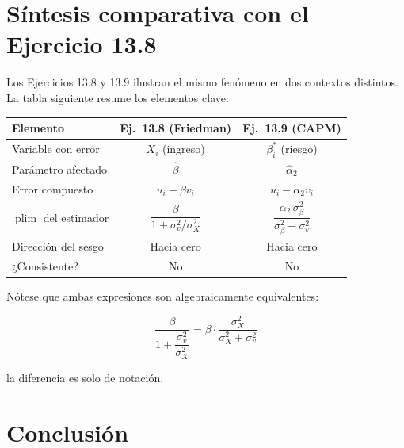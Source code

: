 \documentclass[12pt,letterpaper]{article}
\newcommand{\plim}{\operatorname{plim}}
\begin{document}
\section{Síntesis comparativa con el Ejercicio 13.8}

Los Ejercicios 13.8 y 13.9 ilustran el mismo fenómeno en dos contextos
distintos. La tabla siguiente resume los elementos clave:

\begin{center}
\renewcommand{\arraystretch}{1.4}
\begin{tabular}{lcc}
\toprule
\textbf{Elemento}        & \textbf{Ej.\ 13.8 (Friedman)} & \textbf{Ej.\ 13.9 (CAPM)} \\
\midrule
Variable con error       & $X_{i}$ (ingreso)   & $\beta_{i}^{*}$ (riesgo)   \\
Parámetro afectado       & $\hat{\beta}$       & $\hat{\alpha}_{2}$         \\
Error compuesto          & $u_{i}-\beta v_{i}$ & $u_{i}-\alpha_{2} v_{i}$   \\
$\plim$ del estimador    & $\dfrac{\beta}{1+\sigma_{v}^{2}/\sigma_{X}^{2}}$
                         & $\dfrac{\alpha_{2}\,\sigma_{\beta}^{2}}{\sigma_{\beta}^{2}+\sigma_{v}^{2}}$ \\
Dirección del sesgo      & Hacia cero          & Hacia cero                 \\
¿Consistente?            & No                  & No                         \\
\bottomrule
\end{tabular}
\end{center}

Nótese que ambas expresiones son algebraicamente equivalentes:

\begin{equation}
\frac{\beta}{1+\dfrac{\sigma_{v}^{2}}{\sigma_{X}^{2}}}
=
\beta \cdot \frac{\sigma_{X}^{2}}{\sigma_{X}^{2}+\sigma_{v}^{2}}
\end{equation}

la diferencia es solo de notación.

\section{Conclusión}
\end{document}
